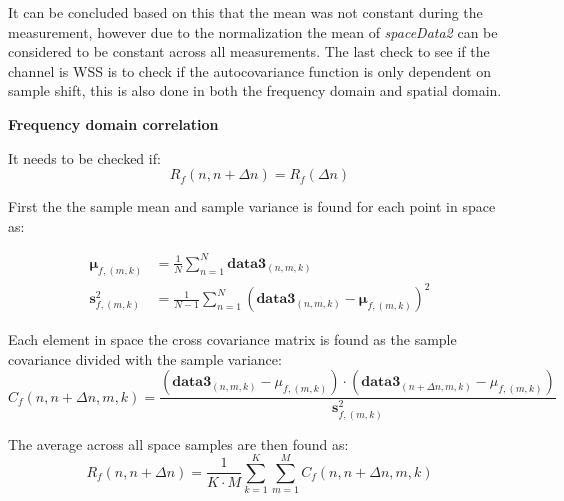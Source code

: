 It can be concluded based on this that the mean was not constant during the measurement, however due to the normalization the mean of \textit{spaceData2} can be considered to be constant across all measurements. The last check to see if the channel is \gls{WSS} is to check if the autocovariance function is only dependent on sample shift, this is also done in both the frequency domain and spatial domain.

\textbf{Frequency domain correlation}

It needs to be checked if:
\begin{equation}\label{eq:autocovariance_check}
R_f(n,n+\Delta n) = R_f(\Delta n) 
\end{equation}
\begin{where}
\end{where}

First the the sample mean and sample variance is found for each point in space as:

\begin{align}
\mathbf{\mu}_{f,(m,k)} &= \frac{1}{N}\sum_{n = 1}^{N} \textbf{data3}_{(n,m,k)} \\
\textbf{s}_{f,(m,k)}^2 &= \frac{1}{N-1}\sum_{n = 1}^{N} \left( \textbf{data3}_{(n,m,k)} - \mathbf{\mu}_{f,(m,k)} \right)^2 
\end{align}
\begin{where}
\end{where}

Each element in space the cross covariance matrix is found as the sample covariance divided with the sample variance:
\begin{equation}
C_f(n,n+\Delta n,m,k) = \frac{\left(\textbf{data3}_{(n,m,k)}-\mu_{f,(m,k)}\right)\cdot \left(\textbf{data3}_{(n+\Delta n,m,k)}-\mu_{f,(m,k)}\right)}{\textbf{s}_{f,(m,k)}^2}
\end{equation}
\begin{where}
\end{where}

The average across all space samples are then found as:
\begin{equation}
R_f(n,n+\Delta n) = \frac{1}{K\cdot M}\sum_{k = 1}^{K}\sum_{m = 1}^{M} C_f(n,n+\Delta n,m,k)
\end{equation}


